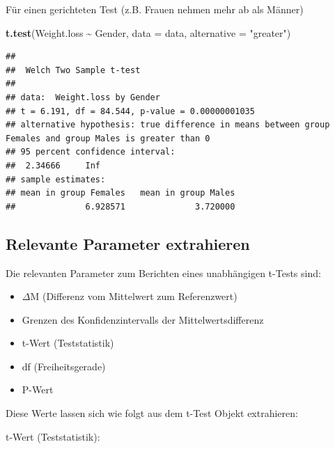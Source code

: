 \documentclass[
]{book}
\newenvironment{Shaded}{\begin{snugshade}}{\end{snugshade}}
\newcommand{\AttributeTok}[1]{\textcolor[rgb]{0.13,0.29,0.53}{#1}}
\newcommand{\FunctionTok}[1]{\textcolor[rgb]{0.13,0.29,0.53}{\textbf{#1}}}
\newcommand{\NormalTok}[1]{#1}
\newcommand{\SpecialCharTok}[1]{\textcolor[rgb]{0.81,0.36,0.00}{\textbf{#1}}}
\newcommand{\StringTok}[1]{\textcolor[rgb]{0.31,0.60,0.02}{#1}}
\providecommand{\tightlist}{%
  \setlength{\itemsep}{0pt}\setlength{\parskip}{0pt}}
\begin{document}
Für einen gerichteten Test (z.B. Frauen nehmen mehr ab als Männer)

\begin{Shaded}
\begin{Highlighting}[]
\FunctionTok{t.test}\NormalTok{(Weight.loss }\SpecialCharTok{\textasciitilde{}}\NormalTok{ Gender, }\AttributeTok{data =}\NormalTok{ data, }\AttributeTok{alternative =} \StringTok{"greater"}\NormalTok{)}
\end{Highlighting}
\end{Shaded}

\begin{verbatim}
## 
##  Welch Two Sample t-test
## 
## data:  Weight.loss by Gender
## t = 6.191, df = 84.544, p-value = 0.00000001035
## alternative hypothesis: true difference in means between group Females and group Males is greater than 0
## 95 percent confidence interval:
##  2.34666     Inf
## sample estimates:
## mean in group Females   mean in group Males 
##              6.928571              3.720000
\end{verbatim}

\subsection{Relevante Parameter extrahieren}\label{relevante-parameter-extrahieren}

Die relevanten Parameter zum Berichten eines unabhängigen t-Tests sind:

\begin{itemize}
\tightlist
\item
  \(\Delta\)M (Differenz vom Mittelwert zum Referenzwert)
\item
  Grenzen des Konfidenzintervalls der Mittelwertsdifferenz
\item
  t-Wert (Teststatistik)
\item
  df (Freiheitsgerade)
\item
  P-Wert
\end{itemize}

Diese Werte lassen sich wie folgt aus dem t-Test Objekt extrahieren:

t-Wert (Teststatistik):

\begin{Shaded}
\end{Shaded}
\end{document}
